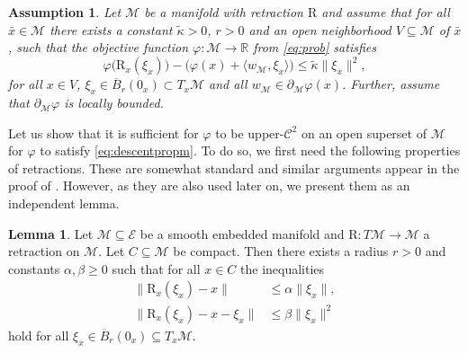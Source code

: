 \documentclass[a4paper, 12pt]{article}
\numberwithin{equation}{section}
\theoremstyle{bolddef}
\newtheorem{assumption}[definition]{Assumption}
\theoremstyle{definition}
\theoremstyle{boldplain}
\newtheorem{lemma}[definition]{Lemma}
\newcommand{\R}{\mathbb{R}}
\newcommand{\clball}{\overline{B}}
\newcommand{\retr}{\mathrm{R}}
\begin{document}
\begin{assumption}\label{descentas}
	Let $\mathcal{M}$ be a manifold with retraction $\retr$ and assume that for all $\bar x \in \mathcal{M}$ there exists a constant $\tilde \kappa > 0$, $r>0$ and an open neighborhood $V\subseteq \mathcal{M}$ of $\bar x$, such that the objective function $\varphi: \mathcal{M} \to \R$ from \eqref{eq:prob} satisfies
	\begin{equation}\label{eq:descentpropm}
		\varphi \big(\retr_x(\xi_x)\big) - \big(\varphi(x) + \langle w_\mathcal{M}, \xi_x \rangle\big) \leq \tilde \kappa \|\xi_x\|^2,
	\end{equation}
	for all $x \in V$, $\xi_x \in \clball_r(0_x) \subset T_x \mathcal{M}$ and all $w_\mathcal{M} \in \partial_\mathcal{M} \varphi(x)$. Further, assume that $\partial_\mathcal{M} \varphi$ is locally bounded.
\end{assumption}
Let us show that it is sufficient for $\varphi$ to be upper-$\mathcal{C}^2$ on an open superset of $\mathcal{M}$ for $\varphi$ to satisfy \eqref{eq:descentpropm}. To do so, we first need the following properties of retractions. These are somewhat standard and similar arguments appear in the proof of \cite[Lemma 2.7]{Boumal2018}. However, as they are also used later on, we present them as an independent lemma.
\begin{lemma}\label{lemma:propretr}
	Let $\mathcal{M} \subseteq \mathcal{E}$ be a smooth embedded manifold and $\retr: T\mathcal{M} \to \mathcal{M}$ a retraction on $\mathcal{M}$. Let $C \subseteq \mathcal{M}$ be compact. Then there exists a radius $r > 0$ and constants $\alpha, \beta \geq 0$ such that for all $x \in C$ the inequalities
	\begin{align}
		\|\retr_x(\xi_x) - x \| &\leq \alpha \| \xi_x\|,\label{eq:retrprop1}\\ 
		\|\retr_x(\xi_x) -x-\xi_x\| &\leq \beta \| \xi_x\|^2\label{eq:retrprop2}
	\end{align}
	hold for all $\xi_x \in \clball_r(0_x) \subseteq T_x\mathcal{M}$.
\end{lemma}
\end{document}

